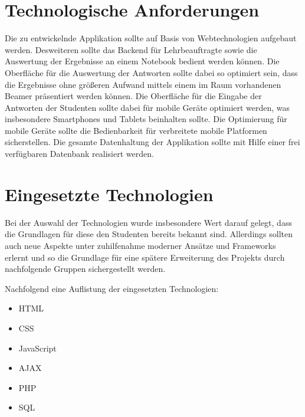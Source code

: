 \section{Technologische Anforderungen}
Die zu entwickelnde Applikation sollte auf Basis von Webtechnologien aufgebaut
werden. Desweiteren sollte das Backend für Lehrbeauftragte sowie die Auswertung
der Ergebnisse an einem Notebook bedient werden können. Die Oberfläche für die
Auswertung der Antworten sollte dabei so optimiert sein, dass die Ergebnisse
ohne größeren Aufwand mittels einem im Raum vorhandenen Beamer präsentiert
werden können.  \newline
Die Oberfläche für die Eingabe der Antworten der Studenten sollte dabei für
mobile Geräte optimiert werden, was insbesondere Smartphones und Tablets
beinhalten sollte. Die Optimierung für mobile Geräte sollte die Bedienbarkeit
für verbreitete mobile Platformen sicherstellen. \newline
Die gesamte Datenhaltung der Applikation sollte mit Hilfe einer frei verfügbaren
Datenbank realisiert werden. 

\section{Eingesetzte Technologien}
Bei der Auswahl der Technologien wurde insbesondere Wert darauf gelegt, dass die
Grundlagen für diese den Studenten bereits bekannt sind. Allerdings sollten auch
neue Aspekte unter  zuhilfenahme moderner Ansätze und Frameworks erlernt und so
die Grundlage für eine spätere Erweiterung des Projekts durch nachfolgende
Gruppen sichergestellt werden.

Nachfolgend eine Auflistung der eingesetzten Technologien:
\begin{singlespacing}
  \begin{multicols}{3}
\begin{itemize}
  \item HTML
  \item CSS
  \item JavaScript
  \item AJAX
  \item PHP
  \item SQL
\end{itemize}
\end{multicols}
\end{singlespacing}
